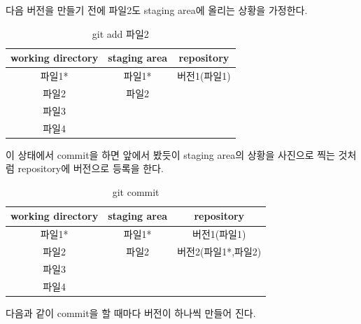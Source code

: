 \documentclass[letterpaper,12pt]{article}
\begin{document}
다음 버전을 만들기 전에 파일2도 staging area에 올리는 상황을 가정한다.

\clearpage

\begin{table}[ht]
\begin{center}
\label{tbl:bins} %
\begin{tabular}{|ccc|} 
\hline
\multicolumn{1}{|c}{working directory} & \multicolumn{1}{c}{staging area} & repository\\
\hline
파일1* &   파일1* & 버전1(파일1)\\
파일2 &    파일2& \\
파일3 &    & \\
파일4 &    & \\
\hline
\end{tabular}
\end{center}
\caption{git add 파일2}
\end{table}

이 상태에서 commit을 하면 앞에서 봤듯이 staging area의 상황을 사진으로 찍는 것처럼 repository에 버전으로 등록을 한다.

\begin{table}[ht]
\begin{center}
\label{tbl:bins} %
\begin{tabular}{|ccc|} 
\hline
\multicolumn{1}{|c}{working directory} & \multicolumn{1}{c}{staging area} & repository\\
\hline
파일1* &   파일1* & 버전1(파일1)\\
파일2 &    파일2& 버전2(파일1*,파일2)\\
파일3 &    & \\
파일4 &    & \\
\hline
\end{tabular}
\end{center}
\caption{git commit}
\end{table}

다음과 같이 commit을 할 때마다 버전이 하나씩 만들어 진다.
\end{document}
